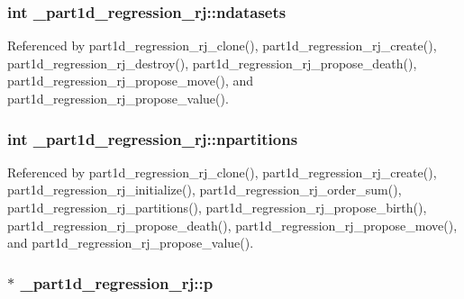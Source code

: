 \subsubsection[{\texorpdfstring{ndatasets}{ndatasets}}]{\setlength{\rightskip}{0pt plus 5cm}int \+\_\+part1d\+\_\+regression\+\_\+rj\+::ndatasets}\hypertarget{struct__part1d__regression__rj_aaa93aadcdc2c46db839b9952d4fa4dd1}{}\label{struct__part1d__regression__rj_aaa93aadcdc2c46db839b9952d4fa4dd1}


Referenced by part1d\+\_\+regression\+\_\+rj\+\_\+clone(), part1d\+\_\+regression\+\_\+rj\+\_\+create(), part1d\+\_\+regression\+\_\+rj\+\_\+destroy(), part1d\+\_\+regression\+\_\+rj\+\_\+propose\+\_\+death(), part1d\+\_\+regression\+\_\+rj\+\_\+propose\+\_\+move(), and part1d\+\_\+regression\+\_\+rj\+\_\+propose\+\_\+value().

\subsubsection[{\texorpdfstring{npartitions}{npartitions}}]{\setlength{\rightskip}{0pt plus 5cm}int \+\_\+part1d\+\_\+regression\+\_\+rj\+::npartitions}\hypertarget{struct__part1d__regression__rj_a585d49fd3d796b1efd1e15bd75c31ef0}{}\label{struct__part1d__regression__rj_a585d49fd3d796b1efd1e15bd75c31ef0}


Referenced by part1d\+\_\+regression\+\_\+rj\+\_\+clone(), part1d\+\_\+regression\+\_\+rj\+\_\+create(), part1d\+\_\+regression\+\_\+rj\+\_\+initialize(), part1d\+\_\+regression\+\_\+rj\+\_\+order\+\_\+sum(), part1d\+\_\+regression\+\_\+rj\+\_\+partitions(), part1d\+\_\+regression\+\_\+rj\+\_\+propose\+\_\+birth(), part1d\+\_\+regression\+\_\+rj\+\_\+propose\+\_\+death(), part1d\+\_\+regression\+\_\+rj\+\_\+propose\+\_\+move(), and part1d\+\_\+regression\+\_\+rj\+\_\+propose\+\_\+value().

\subsubsection[{\texorpdfstring{p}{p}}]{$\ast$ \+\_\+part1d\+\_\+regression\+\_\+rj\+::p}\hypertarget{struct__part1d__regression__rj_afc2d3943cc23cc99a52e219d50534e83}{}\label{struct__part1d__regression__rj_afc2d3943cc23cc99a52e219d50534e83}


